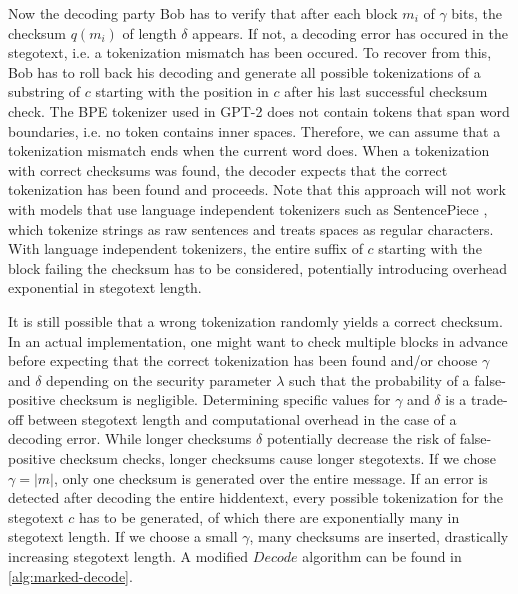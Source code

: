 Now the decoding party Bob has to verify that after each block $m_i$ of $\gamma$ bits, the checksum $q(m_i)$ of length $\delta$ appears.
If not, a decoding error has occured in the stegotext, i.e. a tokenization mismatch has been occured.
To recover from this, Bob has to roll back his decoding and generate all possible tokenizations of a substring of $c$ starting with the position in $c$ after his last successful checksum check.
The BPE tokenizer used in GPT-2 does not contain tokens that span word boundaries, i.e. no token contains inner spaces. Therefore, we can assume that a tokenization mismatch ends when the current word does.
When a tokenization with correct checksums was found, the decoder expects that the correct tokenization has been found and proceeds.
Note that this approach will not work with models that use language independent tokenizers such as SentencePiece \cite{SentencePiece2018}, which tokenize strings as raw sentences and treats spaces as regular characters.
With language independent tokenizers, the entire suffix of $c$ starting with the block failing the checksum has to be considered, potentially introducing overhead exponential in stegotext length.

It is still possible that a wrong tokenization randomly yields a correct checksum.
In an actual implementation, one might want to check multiple blocks in advance before expecting that the correct tokenization has been found and/or choose $\gamma$ and $\delta$ depending on the security parameter $\lambda$ such that the probability of a false-positive checksum is negligible.
Determining specific values for $\gamma$ and $\delta$ is a trade-off between stegotext length and computational overhead in the case of a decoding error.
While longer checksums $\delta$ potentially decrease the risk of false-positive checksum checks, longer checksums cause longer stegotexts.
If we chose $\gamma = |m|$, only one checksum is generated over the entire message. 
If an error is detected after decoding the entire hiddentext, every possible tokenization for the stegotext $c$ has to be generated, of which there are exponentially many in stegotext length.
If we choose a small $\gamma$, many checksums are inserted, drastically increasing stegotext length.
A modified $Decode$ algorithm can be found in \autoref{alg:marked-decode}.

